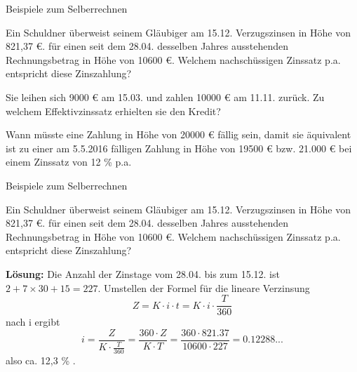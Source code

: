 \begin{frame}{Beispiele zum Selberrechnen}
{\small 	\begin{example}
		Ein Schuldner überweist seinem Gläubiger am 15.12. Verzugszinsen in Höhe von 821,37 €. für einen seit dem 28.04. desselben Jahres ausstehenden Rechnungsbetrag in Höhe von 10600 €. Welchem nachschüssigen Zinssatz p.a. entspricht diese Zinszahlung?
	\end{example}
	\begin{example}
		Sie leihen sich 9000 € am 15.03. und zahlen 10000 € am 11.11. zurück. Zu welchem Effektivzinssatz erhielten sie den Kredit?
	\end{example}
	\begin{example}
		Wann müsste eine Zahlung in Höhe von 20000 € fällig sein, damit sie äquivalent ist zu einer am 5.5.2016 fälligen Zahlung in Höhe von 19500 € bzw. 21.000 € bei einem Zinssatz von 12 \% p.a. 	
	\end{example}		
}\end{frame}

\begin{frame}{Beispiele zum Selberrechnen}
	\begin{example}
		Ein Schuldner überweist seinem Gläubiger am 15.12. Verzugszinsen in Höhe von 821,37 €. für einen seit dem 28.04. desselben Jahres ausstehenden Rechnungsbetrag in Höhe von 10600 €. Welchem nachschüssigen Zinssatz p.a. entspricht diese Zinszahlung?
		
		\textbf{Lösung:} Die Anzahl der Zinstage vom 28.04. bis zum 15.12. ist $2 + 7 \times 30 + 15 = 227$. 
		Umstellen der Formel für die lineare Verzinsung
		\[
		Z = K \cdot i \cdot t = K \cdot i \cdot \frac{T}{360}
		\] 
		nach i ergibt
		\[
		i = \frac{Z}{K \cdot \frac{T}{360}} = \frac{360 \cdot Z}{K \cdot T} = \frac{360 \cdot 821.37}{10600 \cdot 227} = 0.12288...
		\] 
		also ca. 12,3 \% .
	\end{example}
\end{frame}

